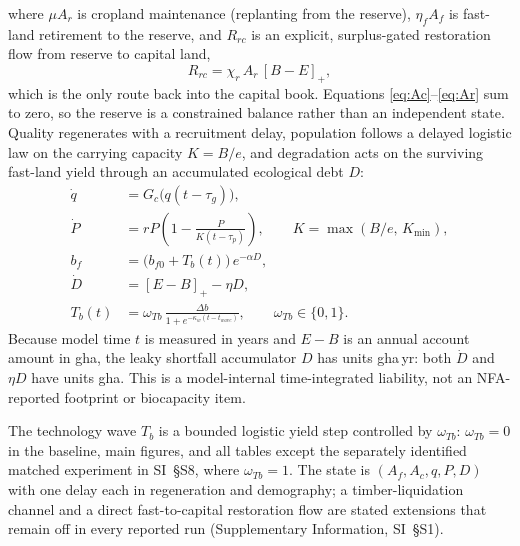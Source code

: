 \documentclass[preprint,12pt,authoryear]{elsarticle}
\newcommand{\pos}[1]{\left[#1\right]_+}
\begin{document}
where $\mu A_r$ is cropland maintenance (replanting from the reserve), $\eta_f A_f$ is fast-land retirement to the reserve, and $R_{rc}$ is an explicit, surplus-gated restoration flow from reserve to capital land,
\begin{equation}\label{eq:Rrc}
R_{rc}=\chi_r\,A_r\,\pos{B-E},
\end{equation}
which is the only route back into the capital book. Equations \eqref{eq:Ac}--\eqref{eq:Ar} sum to zero, so the reserve is a constrained balance rather than an independent state. Quality regenerates with a recruitment delay, population follows a delayed logistic law \citep{Pearl1925,Hutchinson1948} on the carrying capacity $K=B/e$, and degradation acts on the surviving fast-land yield through an accumulated ecological debt $D$:
\begin{align}
\dot q&=G_c\big(q(t-\tau_g)\big),\label{eq:q}\\
\dot P&=rP\left(1-\frac{P}{K(t-\tau_p)}\right),\qquad K=\max(B/e,\,K_{\min}),\label{eq:P}\\
b_f&=\big(b_{f0}+T_b(t)\big)\,e^{-\alpha D},\label{eq:bf}\\
\dot D&=\pos{E-B}-\eta D,\label{eq:D}\\
T_b(t)&=\omega_{Tb}\,\frac{\Delta b}{1+e^{-\kappa_w(t-t_{wave})}},\qquad \omega_{Tb}\in\{0,1\}.\label{eq:Tb}
\end{align}
Because model time $t$ is measured in years and $E-B$ is an annual account amount in gha, the leaky shortfall accumulator $D$ has units gha\,yr: both $\dot D$ and $\eta D$ have units gha. This is a model-internal time-integrated liability, not an NFA-reported footprint or biocapacity item.

The technology wave $T_b$ is a bounded logistic yield step controlled by $\omega_{Tb}$: $\omega_{Tb}=0$ in the baseline, main figures, and all tables except the separately identified matched experiment in SI~\S S8, where $\omega_{Tb}=1$. The state is $(A_f,A_c,q,P,D)$ with one delay each in regeneration and demography; a timber-liquidation channel and a direct fast-to-capital restoration flow are stated extensions that remain off in every reported run (Supplementary Information, SI~\S S1).
\end{document}
